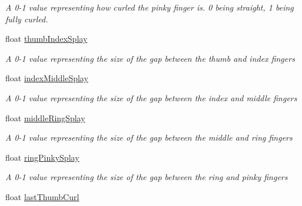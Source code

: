 \begin{DoxyCompactItemize}
\begin{DoxyCompactList}\small\item\em A 0-\/1 value representing how curled the pinky finger is. 0 being straight, 1 being fully curled. \end{DoxyCompactList}\item 
float \mbox{\hyperlink{class_valve_1_1_v_r_1_1_steam_v_r___action___skeleton___source_a427103fac11299cd97a54c1949e973bd}{thumb\+Index\+Splay}}
\begin{DoxyCompactList}\small\item\em A 0-\/1 value representing the size of the gap between the thumb and index fingers \end{DoxyCompactList}\item 
float \mbox{\hyperlink{class_valve_1_1_v_r_1_1_steam_v_r___action___skeleton___source_a7de16520442772d896be0a867046f859}{index\+Middle\+Splay}}
\begin{DoxyCompactList}\small\item\em A 0-\/1 value representing the size of the gap between the index and middle fingers \end{DoxyCompactList}\item 
float \mbox{\hyperlink{class_valve_1_1_v_r_1_1_steam_v_r___action___skeleton___source_a03672b4ae90abc42564d7775bdaf2fb4}{middle\+Ring\+Splay}}
\begin{DoxyCompactList}\small\item\em A 0-\/1 value representing the size of the gap between the middle and ring fingers \end{DoxyCompactList}\item 
float \mbox{\hyperlink{class_valve_1_1_v_r_1_1_steam_v_r___action___skeleton___source_a28e97373e54fcb74766416b9ed5810c0}{ring\+Pinky\+Splay}}
\begin{DoxyCompactList}\small\item\em A 0-\/1 value representing the size of the gap between the ring and pinky fingers \end{DoxyCompactList}\item 
float \mbox{\hyperlink{class_valve_1_1_v_r_1_1_steam_v_r___action___skeleton___source_a5df36c1b14347ffd7d64518678a6acbd}{last\+Thumb\+Curl}}

\end{DoxyCompactItemize}
